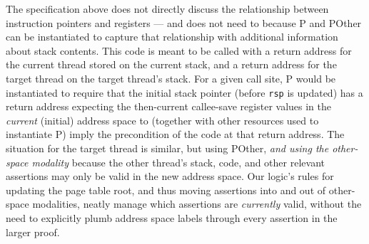 The specification above does not directly discuss the relationship between instruction pointers and registers --- and does not need to
because \textsf{P} and \textsf{POther} can be instantiated to capture that relationship with additional information about stack contents.
This code is meant to be called with a return address for the current thread stored on the current stack,
and a return address for the target thread on the target thread's stack.
For a given call site, \textsf{P} would be instantiated to require that the initial stack pointer (before \lstinline|rsp| is updated)
has a return address expecting the then-current callee-save register values in the \emph{current} (initial) address space
to (together with other resources used to instantiate \textsf{P}) imply the precondition of the code at that return address.
The situation for the target thread is similar, but using \textsf{POther}, \emph{and using the other-space modality}
because the other thread's stack, code, and other relevant assertions may only be valid in the new address space.
Our logic's rules for updating the page table root, and thus moving assertions into and out of other-space modalities,
neatly manage which assertions are \emph{currently} valid, without the need to explicitly plumb address space labels through
every assertion in the larger proof.


